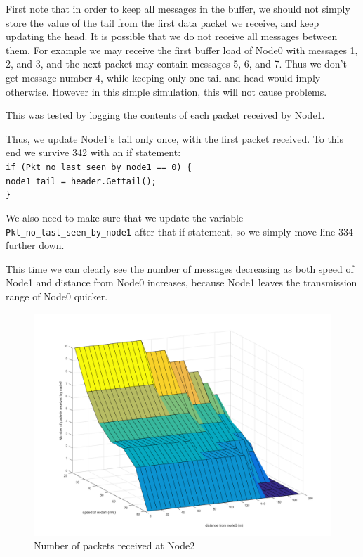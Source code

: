 \documentclass[11pt,journal]{article}
\newcommand\tab[1][1cm]{\hspace*{#1}}
\begin{document}
	First note that in order to keep all messages in the buffer, we should not simply store the value  of the tail from the first data packet we receive, and keep updating the head. It is possible that we do not receive all messages between them. For example we may receive the first buffer load of Node0 with messages 1, 2, and 3, and the next packet may contain messages 5, 6, and 7. Thus we don't get message number 4, while keeping only one tail and head would imply otherwise. However in this simple simulation, this will not cause problems.
	
	This was tested by logging the contents of each packet received by Node1.
	
	Thus, we update Node1's tail only once, with the first packet received. To this end we survive 342 with an if statement:\\
	\tab\texttt{if (Pkt\_no\_last\_seen\_by\_node1 == 0) \{ }\\
	\tab\tab \texttt{node1\_tail = header.Gettail();}\\
	\tab\texttt{\}}
	
	We also need to make sure that we update the variable \texttt{Pkt\_no\_last\_seen\_by\_node1} after that if statement, so we simply move line 334 further down.
	
	This time we can clearly see the number of messages decreasing as both speed of Node1 and distance from Node0 increases, because Node1 leaves the transmission range of Node0 quicker.	
	
	\begin{figure}[h]
		\centering
		\includegraphics[scale=0.4]{graph2b.png}
		\caption{Number of packets received at Node2}
	\end{figure}
	
\end{document}
